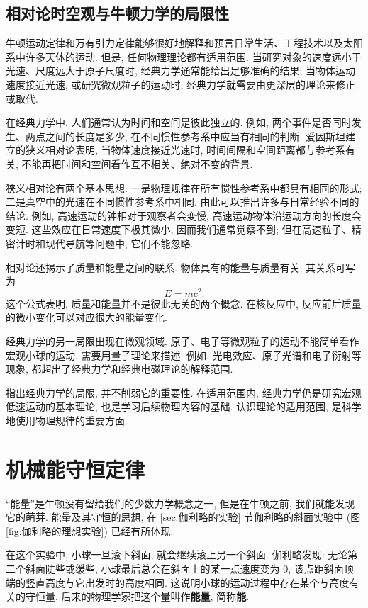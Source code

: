 \documentclass[UTF8,openany,fontset=fandol]{ctexbook}
\theoremstyle{chinesetextbook}
\begin{document}
\section{相对论时空观与牛顿力学的局限性}
牛顿运动定律和万有引力定律能够很好地解释和预言日常生活、工程技术以及太阳系中许多天体的运动. 但是, 任何物理理论都有适用范围. 当研究对象的速度远小于光速、尺度远大于原子尺度时, 经典力学通常能给出足够准确的结果; 当物体运动速度接近光速, 或研究微观粒子的运动时, 经典力学就需要由更深层的理论来修正或取代.

在经典力学中, 人们通常认为时间和空间是彼此独立的. 例如, 两个事件是否同时发生、两点之间的长度是多少, 在不同惯性参考系中应当有相同的判断. 爱因斯坦建立的狭义相对论表明, 当物体速度接近光速时, 时间间隔和空间距离都与参考系有关, 不能再把时间和空间看作互不相关、绝对不变的背景.

狭义相对论有两个基本思想: 一是物理规律在所有惯性参考系中都具有相同的形式; 二是真空中的光速在不同惯性参考系中相同. 由此可以推出许多与日常经验不同的结论. 例如, 高速运动的钟相对于观察者会变慢, 高速运动物体沿运动方向的长度会变短. 这些效应在日常速度下极其微小, 因而我们通常觉察不到; 但在高速粒子、精密计时和现代导航等问题中, 它们不能忽略.

相对论还揭示了质量和能量之间的联系. 物体具有的能量与质量有关, 其关系可写为
\[
E=mc^2.
\]
这个公式表明, 质量和能量并不是彼此无关的两个概念. 在核反应中, 反应前后质量的微小变化可以对应很大的能量变化.

经典力学的另一局限出现在微观领域. 原子、电子等微观粒子的运动不能简单看作宏观小球的运动, 需要用量子理论来描述. 例如, 光电效应、原子光谱和电子衍射等现象, 都超出了经典力学和经典电磁理论的解释范围.

指出经典力学的局限, 并不削弱它的重要性. 在适用范围内, 经典力学仍是研究宏观低速运动的基本理论, 也是学习后续物理内容的基础. 认识理论的适用范围, 是科学地使用物理规律的重要方面.
\chapter{机械能守恒定律}
“能量”是牛顿没有留给我们的少数力学概念之一, 但是在牛顿之前, 我们就能发现它的萌芽. 能量及其守恒的思想, 在 \ref{sec:伽利略的实验} 节伽利略的斜面实验中 (图\ref{fig:伽利略的理想实验}) 已经有所体现.

在这个实验中, 小球一旦滚下斜面, 就会继续滚上另一个斜面. 伽利略发现: 无论第二个斜面陡些或缓些, 小球最后总会在斜面上的某一点速度变为 0, 该点距斜面顶端的竖直高度与它出发时的高度相同. 这说明小球的运动过程中存在某个与高度有关的守恒量. 后来的物理学家把这个量叫作\textbf{能量}, 简称\textbf{能}.
\end{document}
